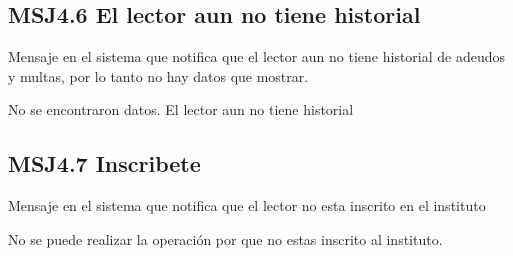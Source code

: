       \subsection{MSJ4.6 El lector aun no tiene historial }

Mensaje en el sistema que notifica que el lector aun no tiene historial de adeudos y multas, por lo tanto no hay datos que mostrar.

  \noindent No se encontraron datos. El lector aun no tiene historial
  
  \subsection{MSJ4.7 Inscribete}

Mensaje en el sistema que notifica que el lector no esta inscrito en el instituto

  \noindent No se puede realizar la operación por que no estas inscrito al instituto.




